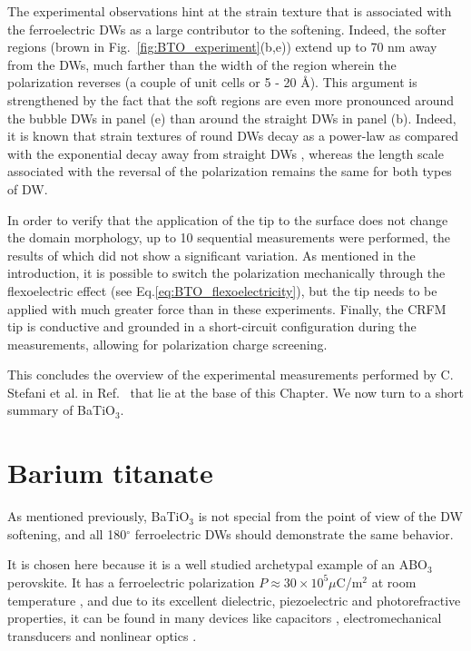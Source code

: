 The experimental observations hint at the strain texture that is associated with the ferroelectric \glspl{DW} as a large contributor to the softening.
Indeed, the softer regions (brown in Fig.~\ref{fig:BTO_experiment}(b,e)) extend up to 70 nm away from the \glspl{DW}, much farther than the width of the region wherein the polarization reverses (a couple of unit cells or 5 - 20 \AA \cite{Zhirnov1959}).
This argument is strengthened by the fact that the soft regions are even more pronounced around the bubble \glspl{DW} in panel (e) than around the straight \glspl{DW} in panel (b).
Indeed, it is known that strain textures of round \glspl{DW} decay as a power-law as compared with the exponential decay away from straight \glspl{DW} \cite{Landau1960}, whereas the length scale associated with the reversal of the polarization remains the same for both types of \gls{DW}.

In order to verify that the application of the tip to the surface does not change the domain morphology, up to 10 sequential measurements were performed, the results of which did not show a significant variation.
As mentioned in the introduction, it is possible to switch the polarization mechanically through the flexoelectric effect (see Eq.\ref{eq:BTO_flexoelectricity}), but the tip needs to be applied with much greater force than in these experiments.
Finally, the \gls{CRFM} tip is conductive and grounded in a short-circuit configuration during the measurements, allowing for polarization charge screening.

This concludes the overview of the experimental measurements performed by C. Stefani et al. in Ref.~\cite{Stefani2020} that lie at the base of this Chapter.
We now turn to a short summary of BaTiO$_3$.

\section{Barium titanate \label{sec:BTO_crystal}}
As mentioned previously, BaTiO$_3$ is not special from the point of view of the \gls{DW} softening, and all 180$^\circ$ ferroelectric \glspl{DW} should demonstrate the same behavior.

It is chosen here because it is a well studied archetypal example of an ABO$_3$ perovskite.
It has a ferroelectric polarization $P \approx 30 \times 10^5 \mu $C/m$^2$ at room temperature \cite{Mason1948, VonHippel1950, Ghosez1994}, and due to its excellent dielectric, piezoelectric and photorefractive properties, it can be found in many devices like capacitors \cite{American1963}, electromechanical transducers \cite{Schofield1957} and nonlinear optics \cite{Ramakanth2015}.

